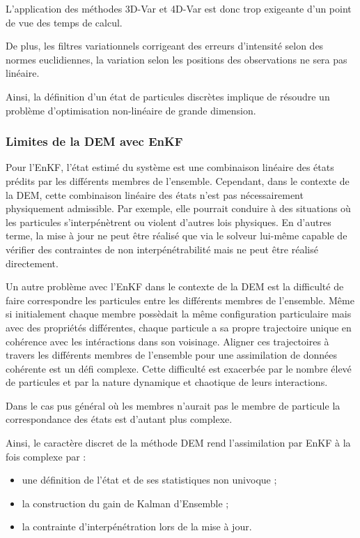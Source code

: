 L'application des méthodes 3D-Var et 4D-Var est donc trop exigeante d'un point de vue des temps de calcul.

De plus, les filtres variationnels corrigeant des erreurs d'intensité selon des normes euclidiennes, la variation selon les positions des observations ne sera pas linéaire.

Ainsi, la définition d'un état de particules discrètes implique de résoudre un problème d'optimisation non-linéaire de grande dimension.

\subsubsection{Limites de la DEM avec EnKF}
Pour l'EnKF, l'état estimé du système est une combinaison linéaire des états prédits par les différents membres de l'ensemble. Cependant, dans le contexte de la DEM, cette combinaison linéaire des états n'est pas nécessairement physiquement admissible. Par exemple, elle pourrait conduire à des situations où les particules s'interpénètrent ou violent d'autres lois physiques.
En d'autres terme, la mise à jour ne peut être réalisé que via le solveur lui-même capable de vérifier des contraintes de non interpénétrabilité mais ne peut être réalisé directement.

Un autre problème avec l'EnKF dans le contexte de la DEM est la difficulté de faire correspondre les particules entre les différents membres de l'ensemble. Même si initialement chaque membre possèdait la même configuration particulaire mais avec des propriétés différentes, chaque particule a sa propre trajectoire unique en cohérence avec les intéractions dans son voisinage. Aligner ces trajectoires à travers les différents membres de l'ensemble pour une assimilation de données cohérente est un défi complexe. Cette difficulté est exacerbée par le nombre élevé de particules et par la nature dynamique et chaotique de leurs interactions.

Dans le cas pus général où les membres n'aurait pas le membre de particule la correspondance des états est d'autant plus complexe.

Ainsi, le caractère discret de la méthode DEM rend l'assimilation par EnKF à la fois complexe par :

\begin{itemize}
    \item une définition de l'état et de ses statistiques non univoque ;
    \item la construction du gain de Kalman d'Ensemble ;
    \item la contrainte d'interpénétration lors de la mise à jour.
\end{itemize}

